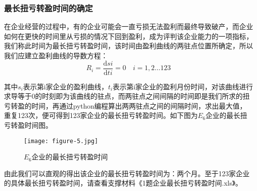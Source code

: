 \documentclass[dvipsnames,withoutpreface,bwprint]{cumcmthesis}
\begin{document}
\subsubsection{最长扭亏转盈时间的确定}
在企业经营的过程中，有的企业可能会一直亏损无法盈利而最终导致破产，而企业如何在更快的时间里从亏损的情况下回到盈利，成为评判该企业能力的一项指标，我们称此时间为最长扭亏转盈时间，该时间由盈利曲线的两驻点位置所确定，所以我们应建立盈利曲线的导数方程：
\begin{equation}
    R_i=\frac{\mathrm{d}si}{\mathrm{d}ti}=0\quad i=1,2\dots123
\end{equation}
\par 其中$s_i$表示第i家企业的盈利曲线，$t_i$表示第i家企业的盈利月份时间，对该曲线进行求导等于0的时刻即为该曲线的驻点，而两驻点之间间隔的时间即是我们所求的扭亏转盈的时间，再通过python编程算出两两驻点之间的间隔时间，求出最大值，重复123次，便可得到123家企业的最长扭亏转盈时间。如下图为$E_6$企业的最长扭亏转盈时间图。
\begin{figure}[H]
    \centering
    \texttt{[image: figure-5.jpg]}
    \caption{$E_6$企业的最长扭亏转盈时间}
    \label{fig:3}%
\end{figure}
\par 由此我们可以直观的得出该企业的最长扭亏转盈时间为：两个月。至于123家企业的具体最长扭亏转盈时间，请查看支撑材料《1题企业最长扭亏转盈时间.xls》。
\end{document}
